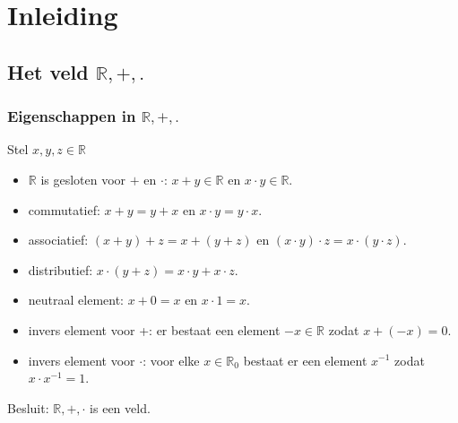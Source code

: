 \section{Inleiding}
\frame{\tableofcontents[currentsection]}

\subsection{Het veld $\mathbb{R},+,.$}
\begin{frame}
\frametitle{Eigenschappen in $\mathbb{R},+,.$}
\pause
\begin{eigenschap}
Stel $x,y,z\in \mathbb{R}$
\pause
\begin{itemize}
\item<+-> $\mathbb{R}$ is gesloten voor $+$ en $\cdot$: $x+y \in \mathbb{R}$ en $x\cdot  y \in \mathbb{R}$.
\item<+-> commutatief: $x+y=y+x$ en $x\cdot  y=y \cdot  x$.
\item<+-> associatief: $(x+y)+z=x+(y+z)$ en $(x\cdot  y)\cdot z = x\cdot  (y\cdot z)$.
\item<+-> distributief: $x\cdot (y+z)=x\cdot  y+x\cdot z$.
\item<+-> neutraal element: $x+0=x$ en $x\cdot  1=x$.
\item<+-> invers element voor +: er bestaat een element $-x\in \mathbb{R}$ zodat $x+(-x)=0$.
\item<+-> invers element voor $\cdot$: voor elke $x\in \mathbb{R}_{0}$ bestaat er een element $x^{-1}$ zodat $x\cdot  x^{-1}=1$.
\end{itemize}
\pause
Besluit: $\mathbb{R},+,\cdot $ is een veld.
\end{eigenschap}
\end{frame}

